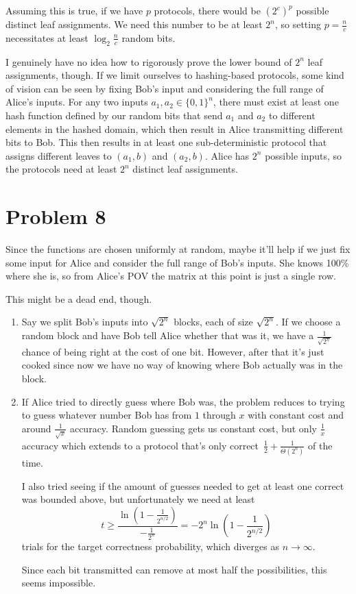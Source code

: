 \documentclass[12pt]{article}
\begin{document}
Assuming this is true, if we have $p$ protocols,
there would be $(2^c)^p$ possible distinct leaf assignments.
We need this number to be at least $2^n$, so setting $p=\frac{n}{c}$ necessitates
at least $\log_2 \frac{n}{c}$ random bits.

I genuinely have no idea how to rigorously prove the lower bound of $2^n$ leaf assignments, though.
If we limit ourselves to hashing-based protocols, some kind of vision can be seen by
fixing Bob's input and considering the full range of Alice's inputs.
For any two inputs $a_1, a_2 \in \{0, 1\}^n$, there must exist at least
one hash function defined by our random bits that send $a_1$ and $a_2$
to different elements in the hashed domain, which then result in Alice
transmitting different bits to Bob.
This then results in at least one sub-deterministic protocol that assigns
different leaves to $(a_1, b)$ and $(a_2, b)$.
Alice has $2^n$ possible inputs, so the protocols need at least $2^n$
distinct leaf assignments.

\newpage

\section*{Problem 8}

Since the functions are chosen uniformly at random, maybe it'll help if we just fix some input
for Alice and consider the full range of Bob's inputs.
She knows 100\% where she is, so from Alice's POV the matrix
at this point is just a single row.

This might be a dead end, though.
\begin{enumerate}
    \item Say we split Bob's inputs into $\sqrt{2^n}$ blocks, each of size $\sqrt{2^n}$.
          If we choose a random block and have Bob tell Alice whether that was it,
          we have a $\frac{1}{\sqrt{2^n}}$ chance of being right at the cost of one bit.
          However, after that it's just cooked since now we have no way of knowing
          where Bob actually was in the block.

    \item If Alice tried to directly guess where Bob was, the problem reduces
          to trying to guess whatever number Bob has from $1$ through $x$ with
          constant cost and around $\frac{1}{\sqrt{x}}$ accuracy.
          Random guessing gets us constant cost, but only $\frac{1}{x}$ accuracy
          which extends to a protocol that's only correct\
          $\frac{1}{2}+\frac{1}{\Theta\left(2^n\right)}$ of the time.

          I also tried seeing if the amount of guesses needed to get at least
          one correct was bounded above, but unfortunately we need at least
          \[t \ge \frac{\ln \left(1-\frac{1}{2^{n/2}}\right)}{-\frac{1}{2^n}}
          = -2^n\ln\left(1-\frac{1}{2^{n/2}}\right)\]
          trials for the target correctness probability, which diverges as $n \to \infty$.

          Since each bit transmitted can remove at most half the possibilities,
          this seems impossible.
\end{enumerate}
\end{document}
